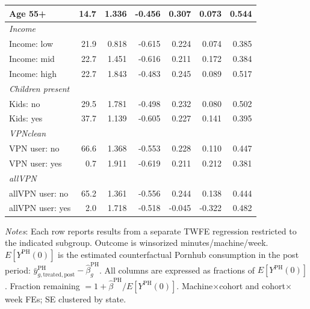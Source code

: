 \begin{landscape}
\begin{table}[htbp]
\begin{tabular}{lrr rrrr}
Age 55+ & 14.7 & 1.336 & -0.456 & 0.307 & 0.073 & 0.544 \\
\midrule
\multicolumn{7}{l}{\textit{Income}} \\
Income: low & 21.9 & 0.818 & -0.615 & 0.224 & 0.074 & 0.385 \\
Income: mid & 22.7 & 1.451 & -0.616 & 0.211 & 0.172 & 0.384 \\
Income: high & 22.7 & 1.843 & -0.483 & 0.245 & 0.089 & 0.517 \\
\midrule
\multicolumn{7}{l}{\textit{Children present}} \\
Kids: no & 29.5 & 1.781 & -0.498 & 0.232 & 0.080 & 0.502 \\
Kids: yes & 37.7 & 1.139 & -0.605 & 0.227 & 0.141 & 0.395 \\
\midrule
\multicolumn{7}{l}{\textit{VPNclean}} \\
VPN user: no & 66.6 & 1.368 & -0.553 & 0.228 & 0.110 & 0.447 \\
VPN user: yes & 0.7 & 1.911 & -0.619 & 0.211 & 0.212 & 0.381 \\
\midrule
\multicolumn{7}{l}{\textit{allVPN}} \\
allVPN user: no & 65.2 & 1.361 & -0.556 & 0.244 & 0.138 & 0.444 \\
allVPN user: yes & 2.0 & 1.718 & -0.518 & -0.045 & -0.322 & 0.482 \\
\bottomrule
\end{tabular}
\vspace{4pt}
\begin{minipage}{\linewidth}\footnotesize
\textit{Notes}: Each row reports results from a separate TWFE regression restricted to the indicated subgroup. Outcome is winsorized minutes/machine/week. $E[Y^{\text{PH}}(0)]$ is the estimated counterfactual Pornhub consumption in the post period: $\bar{y}^{\text{PH}}_{g,\text{treated},\text{post}} - \hat{\beta}^{\text{PH}}_g$. All columns are expressed as fractions of $E[Y^{\text{PH}}(0)]$. Fraction remaining $= 1 + \hat{\beta}^{\text{PH}}/E[Y^{\text{PH}}(0)]$. Machine$\times$cohort and cohort$\times$week FEs; SE clustered by state.
\end{minipage}
\end{table}
\end{landscape}
